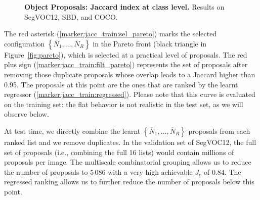 \documentclass[10pt,journal,cspaper,compsoc]{IEEEtran}
\begin{document}
\begin{figure}
{\begin{minipage}[b]{0.39\linewidth}
\end{minipage}}
   \caption{\textbf{Object Proposals: Jaccard index at class level.} Results on SegVOC12, SBD, and COCO.}
   \label{fig:J_c}
\end{figure}




The red asterisk (\ref{marker:jacc_train:sel_pareto}) marks the selected configuration
$\left\{\overline{N}_1,\dots,\overline{N}_R\right\}$ in the Pareto front (black triangle in Figure~\ref{fig:pareto}),
which is selected at a practical level of proposals.
The red plus sign (\ref{marker:jacc_train:filt_pareto}) represents the set of proposals
after removing those duplicate proposals whose overlap leads to a Jaccard higher than 0.95.
The proposals at this point are the ones that are ranked by the learnt regressor (\ref{marker:jacc_train:regressed}).
Please note that this curve is evaluated on the training set: the flat behavior is not realistic in the test set, as we will
observe below.

At test time, we directly combine the learnt $\left\{\overline{N}_1,\dots,\overline{N}_R\right\}$ proposals from each ranked list and 
we remove duplicates.
In the validation set of SegVOC12, the full set of proposals (i.e., combining the full 16 lists)
would contain millions of proposals per image.
The multiscale combinatorial grouping allows us to reduce the number of proposals to $5\,086$
with a very high achievable $J_c$ of $0.84$.
The regressed ranking allows us to further reduce the number of proposals below this point.
\end{document}
